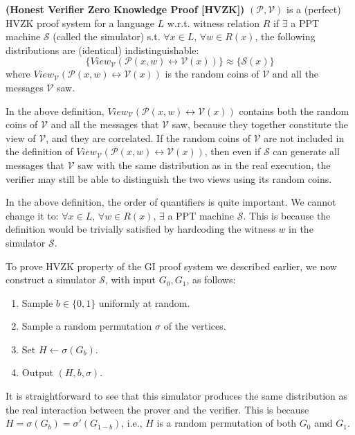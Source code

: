 \documentclass[12pt]{tufte-book}
\begin{document}
		\begin{definition} {\normalfont\textbf{(Honest Verifier Zero Knowledge Proof [HVZK])}} 
			$(\mathcal{P},\mathcal{V})$ is a (perfect) HVZK proof system for a language $L$ w.r.t. witness relation $R$ if 
			$\exists$ a PPT machine $\mathcal{S}$ (called the simulator) s.t. $\forall x \in L$, $\forall w\in R(x)$, the following distributions are (identical) indistinguishable:
		$$\{View_{\mathcal{V}}(\mathcal{P}(x,w) \leftrightarrow \mathcal{V}(x))\} \approx \{\mathcal{S}(x)\}$$
		where $View_{\mathcal{V}}(\mathcal{P}(x,w) \leftrightarrow \mathcal{V}(x))$ is the random coins of $\mathcal{V}$ and all the messages $\mathcal{V}$ saw.
  \end{definition}

\begin{remark}
In the above definition, $View_{\mathcal{V}}(\mathcal{P}(x,w) \leftrightarrow \mathcal{V}(x))$ contains both the random coins of $\mathcal{V}$ and all the messages that $\mathcal{V}$ saw, because they together constitute the view of $\mathcal{V}$, and they are correlated. If the random coins of $\mathcal{V}$ are not included in the definition of $View_{\mathcal{V}}(\mathcal{P}(x,w) \leftrightarrow \mathcal{V}(x))$, then even if $\mathcal{S}$ can generate all messages that $\mathcal{V}$ saw with the same distribution as in the real execution, the verifier may still be able to distinguish the two views using its random coins.
\end{remark}

\begin{remark}
In the above definition, the order of quantifiers is quite important. We cannot change it to: $\forall x \in L$, $\forall w\in R(x)$, $\exists$ a PPT machine $\mathcal{S}$. This is because the definition would be trivially satisfied by hardcoding the witness $w$ in the simulator $\mathcal{S}$.
\end{remark}

To prove HVZK property of the GI proof system we described earlier, we now construct a simulator $\mathcal{S}$, with input $G_0, G_1$, as follows:
\begin{enumerate}
	\item Sample $b\in\{0,1\}$ uniformly at random.
	\item Sample a random permutation $\sigma$ of the vertices.
	\item Set $H \gets \sigma(G_b)$.
	\item Output $(H, b, \sigma)$.
\end{enumerate}
It is straightforward to see that this simulator produces the same distribution as the real interaction between the prover and the verifier. This is because $H = \sigma(G_b) = \sigma'(G_{1-b})$, i.e., $H$ is a random permutation of both $G_0$ amd $G_1$. 
\end{document}

